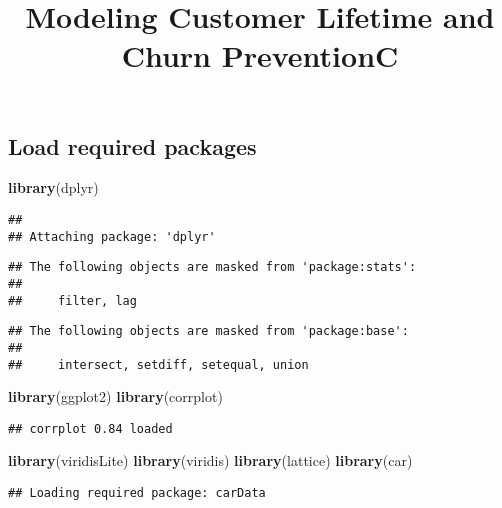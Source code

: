 \documentclass[
]{article}
\title{Modeling Customer Lifetime and Churn PreventionC}
\author{}
\date{\vspace{-2.5em}}
\newenvironment{Shaded}{\begin{snugshade}}{\end{snugshade}}
\newcommand{\KeywordTok}[1]{\textcolor[rgb]{0.13,0.29,0.53}{\textbf{#1}}}
\newcommand{\NormalTok}[1]{#1}
\begin{document}
\maketitle

\hypertarget{load-required-packages}{%
\subsection{Load required packages}\label{load-required-packages}}

\begin{Shaded}
\begin{Highlighting}[]
\KeywordTok{library}\NormalTok{(dplyr)}
\end{Highlighting}
\end{Shaded}

\begin{verbatim}
## 
## Attaching package: 'dplyr'
\end{verbatim}

\begin{verbatim}
## The following objects are masked from 'package:stats':
## 
##     filter, lag
\end{verbatim}

\begin{verbatim}
## The following objects are masked from 'package:base':
## 
##     intersect, setdiff, setequal, union
\end{verbatim}

\begin{Shaded}
\begin{Highlighting}[]
\KeywordTok{library}\NormalTok{(ggplot2)}
\KeywordTok{library}\NormalTok{(corrplot)}
\end{Highlighting}
\end{Shaded}

\begin{verbatim}
## corrplot 0.84 loaded
\end{verbatim}

\begin{Shaded}
\begin{Highlighting}[]
\KeywordTok{library}\NormalTok{(viridisLite)}
\KeywordTok{library}\NormalTok{(viridis)}
\KeywordTok{library}\NormalTok{(lattice)}
\KeywordTok{library}\NormalTok{(car)}
\end{Highlighting}
\end{Shaded}

\begin{verbatim}
## Loading required package: carData
\end{verbatim}
\end{document}
